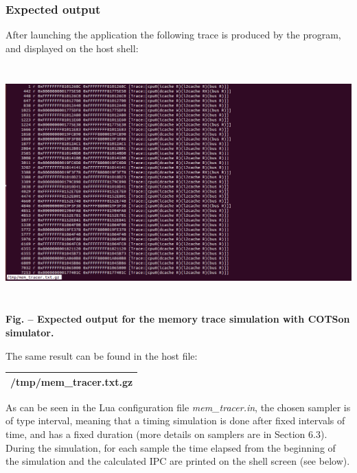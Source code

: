 \documentclass[a4paper]{article}
\newcounter{Figure}
\renewcommand\theFigure{\arabic{Figure}}
\begin{document}
\subsubsection[Expected output]{\rmfamily Expected output}
{
After launching the application the following trace is produced by the
program, and displayed on the host shell:}


\includegraphics[width=6.2661in,height=3.5673in]{img26.png}


{\centering{}\sffamily\bfseries
\label{bkm:Ref388193842}Fig.
\stepcounter{Figure}{\theFigure} -- Expected output for the memory
trace simulation with COTSon simulator.
\par}

{
The same result can be found in the host file:}

\begin{flushleft}
\tablehead{}
\begin{supertabular}{|m{6.21846in}|}
\hline
{}\ttfamily /tmp/mem\_tracer.txt.gz\\\hline
\end{supertabular}
\end{flushleft}
{
As can be seen in the Lua configuration file \textit{mem\_tracer.in},
the chosen sampler is of type interval, meaning that a timing
simulation is done after fixed intervals of time, and has a fixed
duration (more details on samplers are in Section 6.3). During the
simulation, for each sample the time elapsed from the beginning of the
simulation and the calculated IPC are printed on the shell screen (see
below).}
\end{document}
